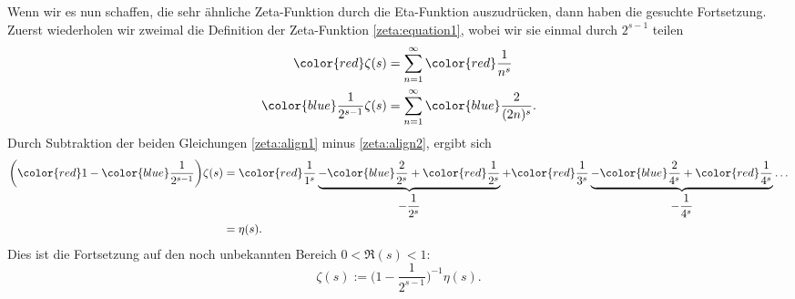 Wenn wir es nun schaffen, die sehr ähnliche Zeta-Funktion durch die Eta-Funktion auszudrücken, dann haben die gesuchte Fortsetzung.
Zuerst wiederholen wir zweimal die Definition der Zeta-Funktion \eqref{zeta:equation1}, wobei wir sie einmal durch $2^{s-1}$ teilen
\begin{align}
    \color{red}
        \zeta(s)
    &=
    \sum_{n=1}^{\infty}
    \color{red}
        \frac{1}{n^s} \label{zeta:align1}
    \\
    \color{blue}
        \frac{1}{2^{s-1}}
        \zeta(s)
    &=
    \sum_{n=1}^{\infty}
    \color{blue}
        \frac{2}{(2n)^s}. \label{zeta:align2}
\end{align}
Durch Subtraktion der beiden Gleichungen \eqref{zeta:align1} minus \eqref{zeta:align2}, ergibt sich
\begin{align}
    \biggl({\color{red}1} - {\color{blue}\frac{1}{2^{s-1}}} \biggr)
    \zeta(s)
    &=
    {\color{red}\frac{1}{1^s}}
    \underbrace{
    -
    {\color{blue}\frac{2}{2^s}}
    +
    {\color{red}\frac{1}{2^s}}
    }_{\displaystyle{-\frac{1}{2^s}}}
    +
    {\color{red}\frac{1}{3^s}}
    \underbrace{-
    {\color{blue}\frac{2}{4^s}}
    +
    {\color{red}\frac{1}{4^s}}
    }_{\displaystyle{-\frac{1}{4^s}}}
    \ldots
    \\
    &= \eta(s).
\end{align}
Dies ist die Fortsetzung auf den noch unbekannten Bereich $0 < \Re(s) < 1$:
\begin{equation} \label{zeta:equation:fortsetzung1}
    \zeta(s)
    :=
    \biggl(1 - \frac{1}{2^{s-1}} \biggr)^{-1} \eta(s).
\end{equation}

